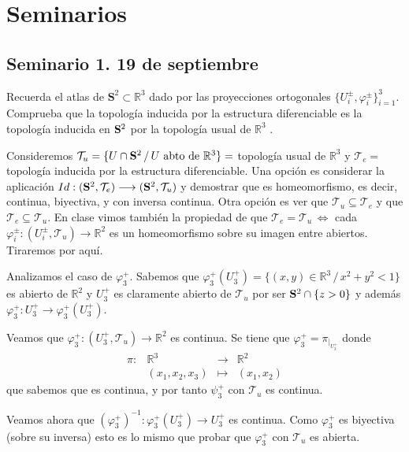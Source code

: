 \justifying
\chapter{Seminarios}
\section{Seminario 1. 19 de septiembre}
\begin{ejer}
    [1] Recuerda el atlas de $\mathbf S^ 2 \subset \mathbb R^3$ dado por las proyecciones ortogonales $\{U_i^{\pm}, \varphi_i^{\pm}\}_{i=1}^3$. Comprueba que la topolog\'ia inducida por la estructura diferenciable es la topolog\'ia
    inducida en $\bold S^2$ por la topolog\'ia usual de $\mathbb R^3$ .
    \begin{sol}
        Consideremos $\mathcal{T}_u = \{U \cap \bold{S}^2 \, / \, U \text{ abto de } \mathbb R^3 \}=$ topolog\'ia usual de $\mathbb R^3$ y $\mathcal{T}_e =$ topolog\'ia inducida por la estructura diferenciable. Una opci\'on es considerar la aplicaci\'on 
        $Id:(\bold{S}^2, \mathcal{T}_e) \longrightarrow (\bold{S}^2, \mathcal{T}_u)$ y demostrar que es homeomorfismo, es decir, continua, biyectiva, y con inversa continua. Otra opci\'on es ver que $\mathcal{T}_u \subseteq \mathcal{T}_e$ y que $\mathcal{T}_e\subseteq \mathcal{T}_u$. En clase vimos tambi\'en la propiedad de que $\mathcal{T}_e = \mathcal{T}_u \, \iff$ cada $\varphi_i^{\pm}: (U_i^{\pm}, \mathcal{T}_u) \longrightarrow \mathbb R^2$ es un homeomorfismo sobre su imagen entre abiertos. Tiraremos por aqu\'i.

        Analizamos el caso de $\varphi_3^{+}$. Sabemos que $\varphi_3^{+}( U_3^{+}) = \{(x,y) \in \mathbb R^3 \, / \, x^2 + y^2 < 1\}$ es abierto de $\mathbb R^2$ y $U_3^{+}$ es  claramente abierto de $\mathcal{T}_u$ por ser $\bold S^2 \cap \{z > 0\}$ y adem\'as $\varphi_3^{+}:  U_3^{+} \longrightarrow \varphi_3^{+}( U_3^{+})$. 

        Veamos que $\varphi_3^{+}: (U_3^{+}, \mathcal{T}_u) \longrightarrow \mathbb R^2$ es continua. Se tiene que $\varphi_3^{+} = \pi_{|_{U_3^+}}$ donde
        $$\begin{array}{rrcl}
             \pi : & \mathbb R^3 & \longrightarrow &  \mathbb R^2 \\
             & (x_1,x_2,x_3) & \longmapsto & (x_1,x_2)
        \end{array}$$
        que sabemos que es continua, y por tanto $\psi_3^+$ con $\mathcal{T}_u$ es continua. 

        Veamos ahora que $(\varphi_3^{+})^{-1}:  \varphi_3^{+}( U_3^{+})\longrightarrow  U_3^{+}$ es continua. Como $\varphi_3^{+}$ es biyectiva (sobre su inversa) esto es lo mismo que probar que $\varphi_3^{+}$ con $\mathcal{T}_u$ es abierta. 


\end{sol}
\end{ejer}
